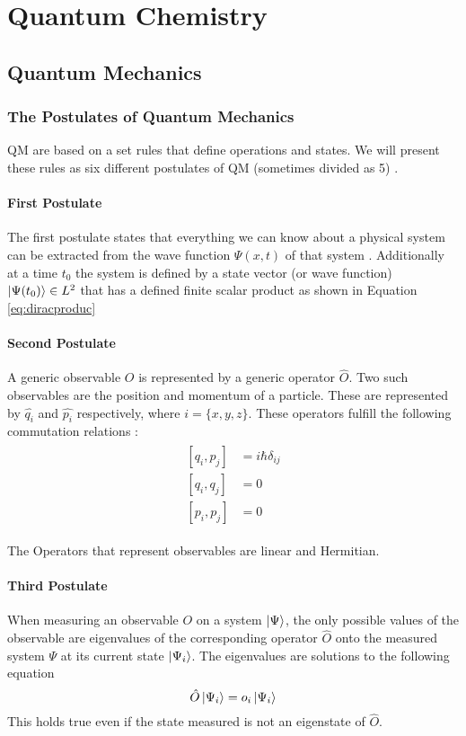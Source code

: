 \documentclass[../master_thesis.tex]{subfiles}
\begin{document}
\chapter{Quantum Chemistry}\label{chap:Quantum_chemistry}
\section{Quantum Mechanics}

\subsection{The Postulates of Quantum Mechanics}

\ac{QM} are based on a set rules that define operations and states. We will
present these rules as six different postulates of \ac{QM} (sometimes divided
as 5) \cite{Atkins:2011, Cohen:1973}.

\subsubsection{First Postulate}
The first postulate states that everything we can know about a physical system
can be extracted from the wave function $\Psi(x, t)$ of that system
\cite{Atkins:2011}. Additionally at a time $t_0$ the system is defined by
a state vector (or wave function) $\ket{\Psi(t_0)}\in L^2$ that has a defined
finite scalar product as shown in Equation \ref{eq:diracproduc} \cite{Cohen:1973}

\subsubsection{Second Postulate}
A generic observable $O$ is represented by a generic operator
$\hat{O}$. Two such observables are the position and momentum of a particle. These are
represented by $\hat{q_i}$ and $\hat{p_i}$ respectively, where
$i = \{x, y, z\}$. These operators fulfill the following commutation relations
\cite{Atkins:2011, Cohen:1973}:
\begin{align}
  \begin{split}
    [q_i, p_j] &= i \hbar \delta_{ij}\\
    [q_i, q_j] &= 0 \\
    [p_i, p_j] &= 0
  \end{split}
\end{align}

The Operators that represent observables are linear and Hermitian.

\subsubsection{Third Postulate}
When measuring an observable $O$ on a system $\ket{\Psi}$, the only possible
values of the observable are eigenvalues of the corresponding operator $\hat{O}$
onto the measured system $\Psi$ at its current state $\ket{\Psi_i}$. The eigenvalues
are solutions to the following equation \cite{Cohen:1973}
\begin{equation}
  \hat{O}\ket{\Psi_i} = o_i \ket{\Psi_i}
\end{equation}
This holds true even if the state measured is not an eigenstate of $\hat{O}$.
\end{document}
